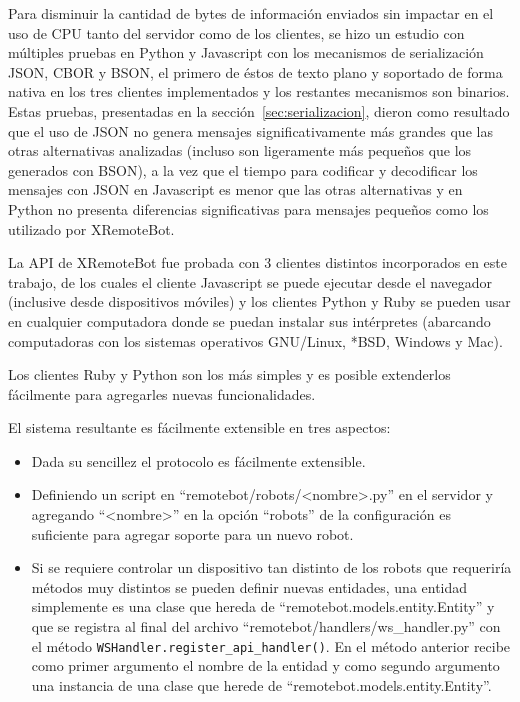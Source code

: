 Para disminuir la cantidad de bytes de información enviados sin impactar en el
uso de CPU tanto del servidor como de los clientes, se hizo un estudio con
múltiples pruebas en Python y Javascript con los mecanismos de serialización
JSON, CBOR y BSON, el primero de éstos de texto plano y soportado de forma nativa en los tres clientes implementados y los restantes mecanismos son binarios. Estas pruebas, presentadas en la sección~\ref{sec:serializacion}, dieron como resultado que el uso de JSON no genera mensajes significativamente más grandes que las otras alternativas analizadas (incluso son ligeramente más pequeños que los generados con BSON), a la vez que el tiempo para codificar y decodificar los mensajes con JSON en
Javascript es menor que las otras alternativas y en Python no presenta
diferencias significativas para mensajes pequeños como los utilizado
por XRemoteBot.

La API de XRemoteBot fue probada con 3 clientes distintos incorporados en este
trabajo, de los cuales el cliente Javascript se puede ejecutar desde el
navegador (inclusive desde dispositivos móviles) y los clientes Python y
Ruby se pueden usar en cualquier computadora
donde se puedan instalar sus intérpretes (abarcando computadoras con
los sistemas operativos GNU/Linux, *BSD, Windows y Mac).

Los clientes Ruby y Python son los más simples y es posible extenderlos
fácilmente para agregarles nuevas funcionalidades.

El sistema resultante es fácilmente extensible en tres aspectos:
\begin{itemize}
    \item Dada su sencillez el protocolo es fácilmente extensible.
    \item Definiendo un script en ``remotebot/robots/<nombre>.py''
en el servidor y agregando ``<nombre>'' en la opción ``robots''
de la configuración es suficiente para agregar soporte
para un nuevo robot.
    \item Si se requiere controlar un dispositivo tan distinto de los
        robots que requeriría métodos muy distintos se pueden definir
        nuevas entidades, una entidad simplemente es una clase que
        hereda de ``remotebot.models.entity.Entity'' y que se
        registra al final del archivo ``remotebot/handlers/ws\_handler.py''
        con el método \texttt{WSHandler.register\_api\_handler()}.
        En el método anterior recibe como primer argumento el
        nombre de la entidad y como segundo argumento una instancia
        de una clase que herede de ``remotebot.models.entity.Entity''.
\end{itemize}

